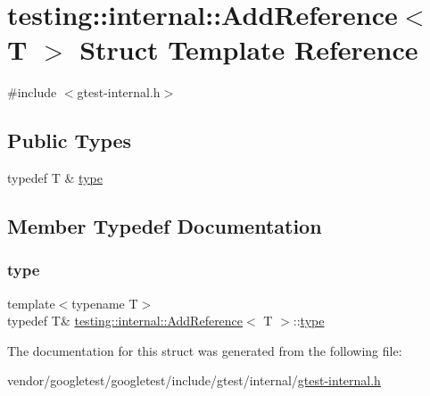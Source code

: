 \hypertarget{structtesting_1_1internal_1_1_add_reference}{}\section{testing\+:\+:internal\+:\+:Add\+Reference$<$ T $>$ Struct Template Reference}
\label{structtesting_1_1internal_1_1_add_reference}


{\ttfamily \#include $<$gtest-\/internal.\+h$>$}

\subsection*{Public Types}
\begin{DoxyCompactItemize}
\item 
typedef T \& \hyperlink{structtesting_1_1internal_1_1_add_reference_a2df8dd7c4e41f6390e6e66b1a9a67bb4}{type}
\end{DoxyCompactItemize}


\subsection{Member Typedef Documentation}
\mbox{\label{structtesting_1_1internal_1_1_add_reference_a2df8dd7c4e41f6390e6e66b1a9a67bb4}} 
\subsubsection{\texorpdfstring{type}{type}}
{\footnotesize\ttfamily template$<$typename T$>$ \\
typedef T\& \hyperlink{structtesting_1_1internal_1_1_add_reference}{testing\+::internal\+::\+Add\+Reference}$<$ T $>$\+::\hyperlink{structtesting_1_1internal_1_1_add_reference_a2df8dd7c4e41f6390e6e66b1a9a67bb4}{type}}



The documentation for this struct was generated from the following file\+:\begin{DoxyCompactItemize}
\item 
vendor/googletest/googletest/include/gtest/internal/\hyperlink{gtest-internal_8h}{gtest-\/internal.\+h}\end{DoxyCompactItemize}
